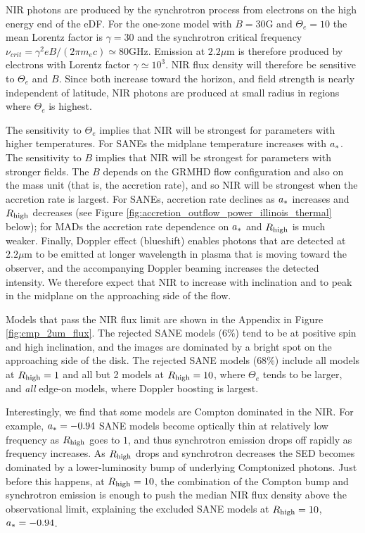 
NIR photons are produced by the synchrotron process from electrons on the high energy end of the eDF.  For the one-zone model with $B = 30$G and $\Theta_e = 10$ the mean Lorentz factor is $\gamma = 30$ and the synchrotron critical frequency $\nu_{crit} = \gamma^2 e B/(2 \pi m_e c) \simeq 80$GHz.  Emission at $2.2\mu$m is therefore produced by electrons with  Lorentz factor $\gamma \simeq 10^3$.  NIR flux density will therefore be sensitive to $\Theta_e$ and $B$.  Since both increase toward the horizon, and field strength is nearly independent of latitude, NIR photons are produced at small radius in regions where $\Theta_e$ is highest.

The sensitivity to $\Theta_e$ implies that NIR will be strongest for parameters with higher temperatures.  For SANEs the midplane temperature increases with $a_*$.
The sensitivity to $B$ implies that NIR will be strongest for parameters with stronger fields.  The $B$ depends on the GRMHD flow configuration and also on the mass unit (that is, the accretion rate), and so NIR will be strongest when the accretion rate is largest.  For SANEs, accretion rate declines as $a_*$ increases and $R_\mathrm{high}$ decreases (see Figure \ref{fig:accretion_outflow_power_illinois_thermal} below); for MADs the accretion rate dependence on $a_*$ and $R_\mathrm{high}$ is much weaker.
Finally, Doppler effect (blueshift) enables photons that are detected at $2.2\mu$m to be emitted at longer wavelength in plasma that is moving toward the observer, and the accompanying Doppler beaming increases the detected intensity.  We therefore expect that NIR to increase with inclination and to peak in the midplane on the approaching side of the flow.

Models that pass the NIR flux limit are shown in the Appendix in Figure \ref{fig:cmp_2um_flux}. The rejected SANE models ($6\%$) tend to be at positive spin and high inclination, and the images are dominated by a bright spot on the approaching side of the disk.
The rejected SANE models ($68\%$) include all models at $R_\mathrm{high} = 1$ and all but 2 models at $R_\mathrm{high} = 10$, where $\Theta_e$ tends to be larger, and {\em all} edge-on models, where Doppler boosting is largest.

Interestingly, we find that some models are Compton dominated in the NIR.  For example, $a_* = -0.94$ SANE models become optically thin at relatively low frequency as $R_\mathrm{high}$ goes to $1$, and thus synchrotron emission drops off rapidly as frequency increases.
As $R_\mathrm{high}$ drops and synchrotron decreases the SED becomes dominated by a lower-luminosity bump of underlying Comptonized photons.  Just before this happens, at $R_\mathrm{high} = 10$, the combination of the Compton bump and synchrotron emission is enough to push the median NIR flux density above the observational limit, explaining the excluded SANE models at $R_\mathrm{high} = 10$, $a_* = -0.94$.

